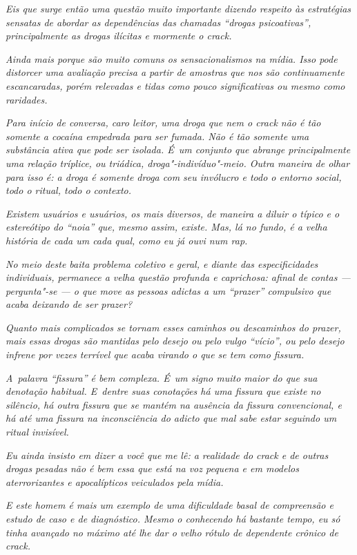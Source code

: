 \emph{Eis que surge então uma questão muito importante dizendo respeito
às estratégias sensatas de abordar as dependências das chamadas ``drogas
psicoativas'', principalmente as drogas ilícitas e mormente o crack.}

\emph{Ainda mais porque são muito comuns os sensacionalismos na mídia.
Isso pode distorcer uma avaliação precisa a partir de amostras que nos
são continuamente escancaradas, porém relevadas e tidas como pouco
significativas ou mesmo como raridades.}

\emph{Para início de conversa, caro leitor, uma droga que nem o crack
não é tão somente a cocaína empedrada para ser fumada. Não é tão somente
uma substância ativa que pode ser isolada. É~um conjunto que abrange
principalmente uma relação tríplice, ou triádica, droga"-indivíduo"-meio.
Outra maneira de olhar para isso é: a droga é somente droga com seu
invólucro e todo o entorno social, todo o ritual, todo o contexto.}

\emph{Existem usuários e usuários, os mais diversos, de maneira a diluir
o típico e o estereótipo do ``noia'' que, mesmo assim, existe. Mas, lá no
fundo, é a velha história de cada um cada qual, como eu já ouvi num
rap.}

\emph{No meio deste baita problema coletivo e geral, e diante das
especificidades individuais, permanece a velha questão profunda e
caprichosa: afinal de contas --- pergunta"-se --- o que move as pessoas
adictas a um ``prazer'' compulsivo que acaba deixando de ser prazer?}

\emph{Quanto mais complicados se tornam esses caminhos ou descaminhos do
prazer, mais essas drogas são mantidas pelo desejo ou pelo vulgo
``vício'', ou pelo desejo infrene por vezes terrível que acaba virando o
que se tem como fissura.}

\emph{A~palavra ``fissura'' é bem complexa. É~um signo muito maior do que
sua denotação habitual. E~dentre suas conotações há uma fissura que
existe no silêncio, há outra fissura que se mantém na ausência da
fissura convencional, e há até uma fissura na inconsciência do adicto
que mal sabe estar seguindo um ritual invisível.}

\emph{Eu ainda insisto em dizer a você que me lê: a realidade do crack e
de outras drogas pesadas não é bem essa que está na voz pequena e em
modelos aterrorizantes e apocalípticos veiculados pela mídia.}

\emph{E este homem é mais um exemplo de uma dificuldade basal de
compreensão e estudo de caso e de diagnóstico. Mesmo o conhecendo há
bastante tempo, eu só tinha avançado no máximo até lhe dar o velho
rótulo de dependente crônico de crack.}

